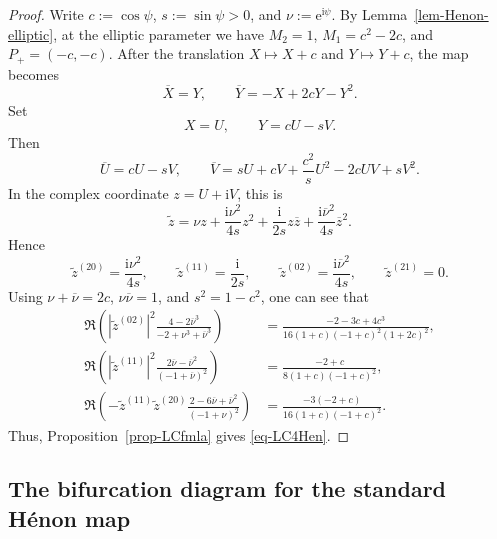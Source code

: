 \documentclass[11pt,a4paper]{article}
\theoremstyle{plain}
\theoremstyle{definition}
\theoremstyle{plain}
\numberwithin{equation}{section}
\begin{document}
\begin{proof}
Write $c := \cos\psi$, $s := \sin\psi > 0$, and $\nu := \mathrm{e}^{\mathrm{i}\psi}$. By Lemma~\ref{lem-Henon-elliptic}, at the elliptic parameter we have $M_2 = 1$, $M_1 = c^2 - 2c$, and $P_+ = (-c,-c)$. After the translation $X \longmapsto X + c$ and $Y \longmapsto Y + c$, the map becomes
\[
\overline{X} = Y,
\qquad
\overline{Y} = -X + 2cY - Y^2.
\]
Set
\[
X = U,
\qquad
Y = cU - sV.
\]
Then
\[
\overline{U} = cU - sV,
\qquad
\overline{V} = sU + cV + \frac{c^2}{s}U^2 - 2cUV + sV^2.
\]
In the complex coordinate $z = U + \mathrm{i}V$, this is
\[
\widetilde{z}
=
\nu z
+
\frac{\mathrm{i}\nu^2}{4s} z^2
+
\frac{\mathrm{i}}{2s} z\overline z
+
\frac{\mathrm{i}\overline\nu^2}{4s} \overline z^2.
\]
Hence
\[
\widetilde{z}^{(20)} = \frac{\mathrm{i}\nu^2}{4s},
\qquad
\widetilde{z}^{(11)} = \frac{\mathrm{i}}{2s},
\qquad
\widetilde{z}^{(02)} = \frac{\mathrm{i}\overline\nu^2}{4s},
\qquad
\widetilde{z}^{(21)} = 0.
\]
Using $\nu + \overline\nu = 2c$, $\nu\overline\nu = 1$, and $s^2 = 1 - c^2$, one can see that
\begin{align*}
\Re \left( |\widetilde{z}^{(02)}|^2 \frac{4 - 2\overline{\nu}^3}{-2 + \nu^3 + \overline{\nu}^3} \right) &= \frac{-2 - 3c + 4c^3}{16(1 + c)(-1 + c)^2(1 + 2c)^2}, \\
\Re \left( |\widetilde{z}^{(11)}|^2 \frac{2 \overline{\nu} - \overline{\nu}^2}{(-1 + \overline{\nu})^2} \right) &= \frac{-2 + c}{8(1 + c)(-1 + c)^2}, \\
\Re \left( - \widetilde{z}^{(11)} \widetilde{z}^{(20)}\frac{2 - 6 \overline{\nu} + \overline{\nu}^2}{(-1 + \nu)^2} \right) &= \frac{-3(-2 + c)}{16(1 + c)(-1 + c)^2}.
\end{align*}
Thus, Proposition~\ref{prop-LCfmla} gives \eqref{eq-LC4Hen}.
\end{proof}
\subsection{The bifurcation diagram for the standard H\'enon map}
\end{document}
